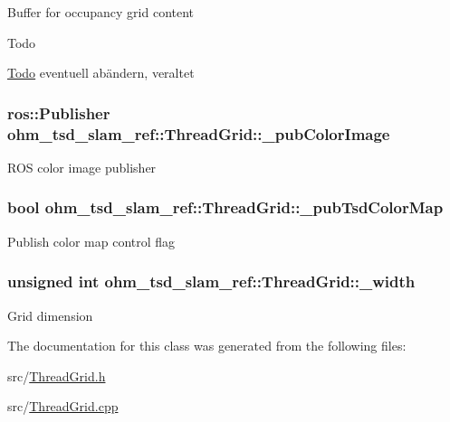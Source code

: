Buffer for occupancy grid content \begin{DoxyRefDesc}{Todo}
\item[\hyperlink{todo__todo000018}{Todo}]eventuell abändern, veraltet \end{DoxyRefDesc}
\hypertarget{classohm__tsd__slam__ref_1_1ThreadGrid_a86ea0357d397f91ef76eb40389fb55e0}{
\subsubsection[{\-\_\-pub\-Color\-Image}]{\setlength{\rightskip}{0pt plus 5cm}ros\-::\-Publisher ohm\-\_\-tsd\-\_\-slam\-\_\-ref\-::\-Thread\-Grid\-::\-\_\-pub\-Color\-Image\hspace{0.3cm}{\ttfamily [private]}}}\label{classohm__tsd__slam__ref_1_1ThreadGrid_a86ea0357d397f91ef76eb40389fb55e0}
R\-O\-S color image publisher \hypertarget{classohm__tsd__slam__ref_1_1ThreadGrid_a2b8fe225e961331b72894697f1a8b120}{
\subsubsection[{\-\_\-pub\-Tsd\-Color\-Map}]{\setlength{\rightskip}{0pt plus 5cm}bool ohm\-\_\-tsd\-\_\-slam\-\_\-ref\-::\-Thread\-Grid\-::\-\_\-pub\-Tsd\-Color\-Map\hspace{0.3cm}{\ttfamily [private]}}}\label{classohm__tsd__slam__ref_1_1ThreadGrid_a2b8fe225e961331b72894697f1a8b120}
Publish color map control flag \hypertarget{classohm__tsd__slam__ref_1_1ThreadGrid_a4e18fa3923e4a016ad2ca963ccd318d7}{
\subsubsection[{\-\_\-width}]{\setlength{\rightskip}{0pt plus 5cm}unsigned int ohm\-\_\-tsd\-\_\-slam\-\_\-ref\-::\-Thread\-Grid\-::\-\_\-width\hspace{0.3cm}{\ttfamily [private]}}}\label{classohm__tsd__slam__ref_1_1ThreadGrid_a4e18fa3923e4a016ad2ca963ccd318d7}
Grid dimension 

The documentation for this class was generated from the following files\-:\begin{DoxyCompactItemize}
\item 
src/\hyperlink{ThreadGrid_8h}{Thread\-Grid.\-h}\item 
src/\hyperlink{ThreadGrid_8cpp}{Thread\-Grid.\-cpp}\end{DoxyCompactItemize}
